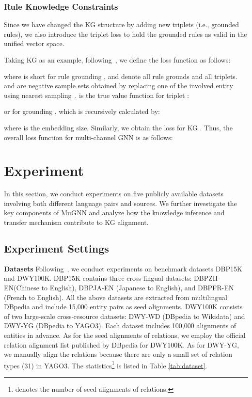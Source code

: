 \documentclass[11pt,a4paper]{article}
\newcommand{\para}[1]{\vspace{0.01in}\noindent\textbf{#1 }}
\begin{document}
\subsubsection*{Rule Knowledge Constraints}
Since we have changed the KG structure by adding new triplets (i.e., grounded rules), we also introduce the triplet loss to hold the grounded rules as valid in the unified vector space.

Taking KG  as an example, following~, we define the loss function as follows:


where  is short for rule grounding ,  and  denote all rule grounds and all triplets.  and  are negative sample sets obtained by replacing one of the involved entity using nearest sampling~\cite{sun2018bootstrapping}.  is the true value function for triplet :


or for grounding , which is recursively calculated by:


where  is the embedding size. Similarly, we obtain the loss  for KG . Thus, the overall loss function for multi-channel GNN is as follows:



\section{Experiment}
In this section, we conduct experiments on five publicly available datasets involving both different language pairs and sources. We further investigate the key components of MuGNN and analyze how the knowledge inference and transfer mechanism contribute to KG alignment.

\subsection{Experiment Settings}

\para{Datasets} Following~\citet{sun2017cross, sun2018bootstrapping}, we conduct experiments on benchmark datasets DBP15K and DWY100K. DBP15K contains three cross-lingual datasets: DBP{\tiny ZH-EN}(Chinese to English), DBP{\tiny JA-EN} (Japanese to English), and DBP{\tiny FR-EN} (French to English). All the above datasets are extracted from multilingual DBpedia and include 15,000 entity pairs as seed alignments. DWY100K consists of two large-scale cross-resource datasets: DWY-WD (DBpedia to Wikidata) and DWY-YG (DBpedia to YAGO3). Each dataset includes 100,000 alignments of entities in advance. As for the seed alignments of relations, we employ the official relation alignment list published by DBpedia for DWY100K. As for DWY-YG, we manually align the relations because there are only a small set of relation types (31) in YAGO3. The statistics\footnote{ denotes the number of seed alignments of relations.} is listed in Table \ref{tab:dataset}.
\end{document}

